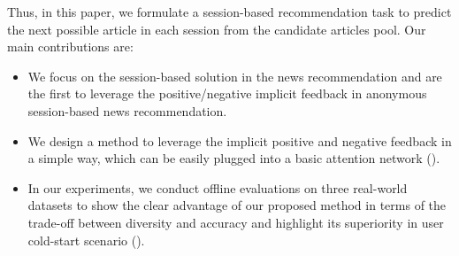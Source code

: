 Thus, in this paper, we formulate a session-based recommendation task to 
predict the next possible article 
in each session from the candidate articles pool. Our main contributions are:
\begin{itemize} 
\item We focus on the session-based solution in the news recommendation and are the first to leverage the positive/negative implicit feedback in anonymous session-based news recommendation. 
\item We design a method to leverage the 
implicit positive and negative feedback in a simple way, which can be easily plugged into a basic attention network (). 
\item In our experiments, we conduct offline evaluations on three real-world datasets to show the clear advantage
of our proposed method in terms of the trade-off between 
diversity and accuracy and highlight its superiority in user cold-start scenario ().
\end{itemize}
